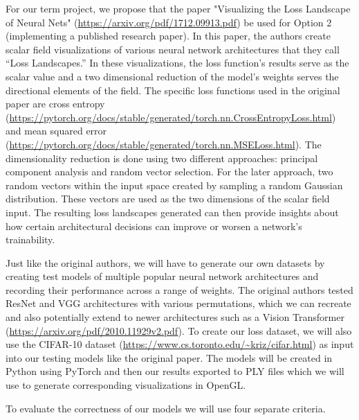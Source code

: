 \documentclass{acmsiggraph}               %
\begin{document}


For our term project, we propose that the paper "Visualizing the Loss Landscape of Neural Nets" (\url{https://arxiv.org/pdf/1712.09913.pdf}) be used for Option 2 (implementing a published research paper). 
In this paper, the authors create scalar field visualizations of various neural network architectures that they call “Loss Landscapes.” In these visualizations, the loss function’s results serve as the scalar value and a two dimensional reduction of the model’s weights serves the directional elements of the field. 
The specific loss functions used in the original paper are cross entropy (\url{https://pytorch.org/docs/stable/generated/torch.nn.CrossEntropyLoss.html}) and mean squared error (\url{https://pytorch.org/docs/stable/generated/torch.nn.MSELoss.html}). 
The dimensionality reduction is done using two different approaches: principal component analysis and random vector selection. 
For the later approach, two random vectors within the input space created by sampling a random Gaussian distribution. These vectors are used as the two dimensions of the scalar field input.
The resulting loss landscapes generated can then provide insights about how certain architectural decisions can improve or worsen a network's trainability.

Just like the original authors, we will have to generate our own datasets by creating test models of multiple popular neural network architectures and recording their performance across a range of weights. 
The original authors tested ResNet and VGG architectures with various permutations, which we can recreate and also potentially extend to newer architectures such as a Vision Transformer (\url{https://arxiv.org/pdf/2010.11929v2.pdf}). 
To create our loss dataset, we will also use the CIFAR-10 dataset (\url{https://www.cs.toronto.edu/~kriz/cifar.html}) as input into our testing models like the original paper. 
The models will be created in Python using PyTorch and then our results exported to PLY files which we will use to generate corresponding visualizations in OpenGL.

To evaluate the correctness of our models we will use four separate criteria. 
\end{document}
